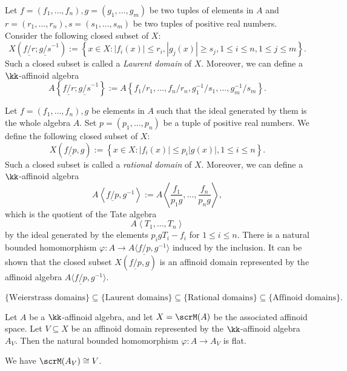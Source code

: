     \begin{construction}\label{constr:Laurent_domain}
        Let \(f=(f_1,\ldots,f_n),g = (g_1,\ldots,g_m)\) be two tuples of elements in \(A\) and \(r=(r_1,\ldots,r_n),s=(s_1,\ldots,s_m)\) be two tuples of positive real numbers.
        Consider the following closed subset of \(X\):
        \[ X\left(\underline{f/r};\underline{g/s}^{-1}\right) := \left\{ x \in X \colon |f_i(x)| \le r_i, |g_j(x)| \ge s_j, 1 \le i \le n, 1 \le j \le m \right\}. \]
        Such a closed subset is called a \emph{Laurent domain} of \(X\).
        Moreover, we can define a \(\kk\)-affinoid algebra
        \[ A\left\{ \underline{f/r};\underline{g/s}^{-1} \right\} := A\left\{ f_1/r_1,\ldots,f_n/r_n,g_1^{-1}/s_1,\ldots,g_m^{-1}/s_m \right\}. \]
    \end{construction}

    \begin{construction}\label{constr:rational_domain}
        Let \(f=(f_1,\ldots,f_n),g\) be elements in \(A\) such that the ideal generated by them is the whole algebra \(A\).
        Set \(p=(p_1,\ldots,p_n)\) be a tuple of positive real numbers.
        We define the following closed subset of \(X\):
        \[ X\left(\underline{f/p},g\right) := \left\{ x \in X \colon |f_i(x)| \le p_i |g(x)|, 1 \le i \le n \right\}. \]
        Such a closed subset is called a \emph{rational domain} of \(X\).
        Moreover, we can define a \(\kk\)-affinoid algebra
        \[ A\left\langle \underline{f/p},g^{-1} \right\rangle := A\left\langle \frac{f_1}{p_1 g},\ldots,\frac{f_n}{p_n g} \right\rangle, \]
        which is the quotient of the Tate algebra
        \[ A\left\langle T_1,\ldots,T_n \right\rangle \]
        by the ideal generated by the elements \(p_i g T_i - f_i\) for \(1 \le i \le n\).
        There is a natural bounded homomorphism \(\varphi: A \to A\langle \underline{f/p},g^{-1} \rangle\) induced by the inclusion.
        It can be shown that the closed subset \(X(\underline{f/p},g)\) is an affinoid domain represented by the affinoid algebra \(A\langle \underline{f/p},g^{-1} \rangle\).
    \end{construction}

    \[ \{\text{Weierstrass domains}\} \subseteq \{\text{Laurent domains}\} \subseteq \{\text{Rational domains}\} \subseteq \{\text{Affinoid domains}\}. \]

    \begin{proposition}\label{prop:affinoid_domain_is_flat_over_base}
        Let \(A\) be a \(\kk\)-affinoid algebra, and let \(X = \scrM(A)\) be the associated affinoid space.
        Let \(V \subseteq X\) be an affinoid domain represented by the \(\kk\)-affinoid algebra \(A_V\).
        Then the natural bounded homomorphism \(\varphi: A \to A_V\) is flat.

        We have \(\scrM(A_V) \cong V\).
    \end{proposition}